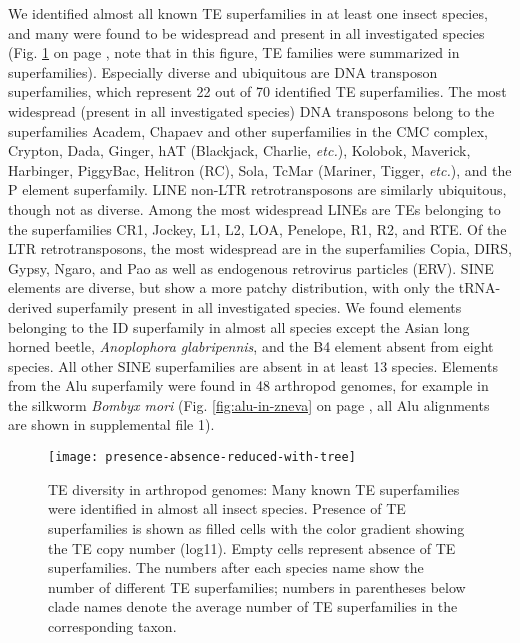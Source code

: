 We identified almost all known TE superfamilies in at least one insect
species, and many were found to be widespread and present in all
investigated species (Fig. \ref{fig:presence-absence} on page
\pageref{fig:presence-absence}, note that in this figure, TE families
were summarized in superfamilies). Especially diverse and ubiquitous are
DNA transposon superfamilies, which represent 22 out of 70 identified TE
superfamilies. The most widespread (present in all investigated species)
DNA transposons belong to the superfamilies Academ, Chapaev and other
superfamilies in the CMC complex, Crypton, Dada, Ginger, hAT (Blackjack,
Charlie, \emph{etc.}), Kolobok, Maverick, Harbinger, PiggyBac, Helitron
(RC), Sola, TcMar (Mariner, Tigger, \emph{etc.}), and the P element
superfamily. LINE non-LTR retrotransposons are similarly ubiquitous,
though not as diverse. Among the most widespread LINEs are TEs belonging
to the superfamilies CR1, Jockey, L1, L2, LOA, Penelope, R1, R2, and
RTE. Of the LTR retrotransposons, the most widespread are in the
superfamilies Copia, DIRS, Gypsy, Ngaro, and Pao as well as endogenous
retrovirus particles (ERV). SINE elements are diverse, but show a more
patchy distribution, with only the tRNA-derived superfamily present in
all investigated species. We found elements belonging to the ID
superfamily in almost all species except the Asian long horned beetle,
\emph{Anoplophora glabripennis}, and the B4 element absent from eight
species. All other SINE superfamilies are absent in at least 13 species.
Elements from the Alu superfamily were found in 48 arthropod genomes,
for example in the silkworm \emph{Bombyx mori} (Fig.
\ref{fig:alu-in-zneva} on page \pageref{fig:alu-in-zneva}, all Alu
alignments are shown in supplemental file 1).

\begin{figure}[h!]
\begin{center}
\texttt{[image: presence-absence-reduced-with-tree]}
\caption[Presence and absence of TE superfamilies in arthropod genomes]{{TE diversity in arthropod genomes: Many known TE superfamilies were
identified in almost all insect species. Presence of TE superfamilies is
shown as filled cells with the color gradient showing the TE copy number
(log11). Empty cells represent absence of TE superfamilies. The numbers
after each species name show the number of different TE superfamilies;
numbers in parentheses below clade names denote the average number of TE
superfamilies in the corresponding taxon.%
}}%
\label{fig:presence-absence}%
\end{center}
\end{figure}

